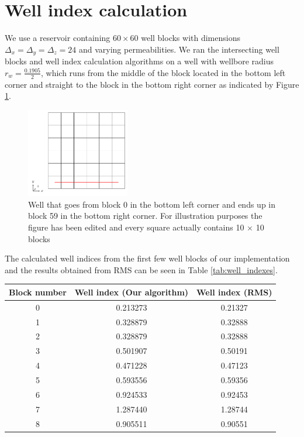 \section{Well index calculation}
%
We use a reservoir containing $60 \times 60$ well blocks with
dimensions $\Delta_x = \Delta_y = \Delta_z = 24$ and varying 
permeabilities. We ran the intersecting well blocks and well 
index calculation algorithms on a well with wellbore radius
$r_w = \frac{0.1905}{2}$,
which runs from the middle of the block located in the bottom
left corner and straight to the block in the bottom right corner
as indicated by Figure \ref{fig:well_intersection}.
%
\begin{figure}[H]
	\centering
	\includegraphics[width=0.40\textwidth]{figures/well_index/well_intersection.pdf}
	\caption{Well that goes from block 0 in the bottom left corner and ends up
	in block 59 in the bottom right corner. For illustration purposes the figure has been edited and every 
	square actually contains 10 $\times$ 10 blocks}
	\label{fig:well_intersection}
\end{figure}
%
The calculated well indices from the first few well
blocks of our implementation and the results obtained 
from RMS can be seen in Table \ref{tab:well_indexes}. 
%
\begin{center}
	\begin{tabular}[h]{ccc}
	Block number & Well index (Our algorithm) & Well index (RMS) \\
	\hline
	\hline
	0 & 0.213273 & 0.21327 \\
	1 & 0.328879 & 0.32888 \\
	2 & 0.328879 & 0.32888 \\ 
	3 & 0.501907 & 0.50191 \\
	4 & 0.471228 & 0.47123 \\
	5 & 0.593556 & 0.59356 \\
	6 & 0.924533 & 0.92453 \\
	7 & 1.287440 & 1.28744 \\
	8 & 0.905511 & 0.90551
	\label{tab:well_indexes}
	\end{tabular}
\end{center}
%
%
